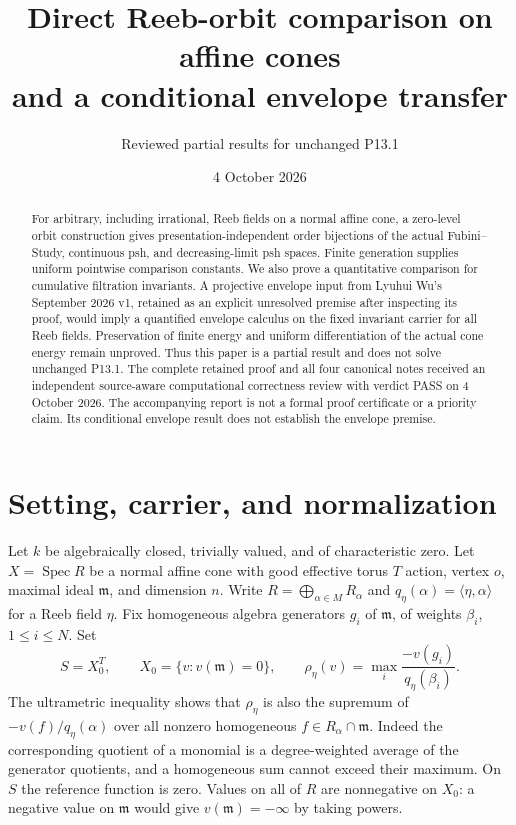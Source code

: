 \documentclass[11pt]{article}
\title{Direct Reeb-orbit comparison on affine cones\\and a conditional envelope transfer}
\author{Reviewed partial results for unchanged P13.1}
\date{4 October 2026}
\begin{document}
\maketitle
\begin{abstract}
For arbitrary, including irrational, Reeb fields on a normal affine cone, a zero-level orbit construction gives presentation-independent order bijections of the actual Fubini--Study, continuous psh, and decreasing-limit psh spaces. Finite generation supplies uniform pointwise comparison constants. We also prove a quantitative comparison for cumulative filtration invariants. A projective envelope input from Lyuhui Wu's September 2026 v1, retained as an explicit unresolved premise after inspecting its proof, would imply a quantified envelope calculus on the fixed invariant carrier for all Reeb fields. Preservation of finite energy and uniform differentiation of the actual cone energy remain unproved. Thus this paper is a partial result and does not solve unchanged P13.1. The complete retained proof and all four canonical notes received an independent source-aware computational correctness review with verdict PASS on 4 October 2026. The accompanying report is not a formal proof certificate or a priority claim. Its conditional envelope result does not establish the envelope premise.
\end{abstract}

\section{Setting, carrier, and normalization}
Let $k$ be algebraically closed, trivially valued, and of characteristic zero.
Let $X=\operatorname{Spec}R$ be a normal affine cone with good effective torus $T$ action, vertex $o$, maximal ideal $\mathfrak m$, and dimension $n$.
Write $R=\bigoplus_{\alpha\in M}R_\alpha$ and $q_\eta(\alpha)=\langle\eta,\alpha\rangle$ for a Reeb field $\eta$.
Fix homogeneous algebra generators $g_i$ of $\mathfrak m$, of weights $\beta_i$, $1\leq i\leq N$.
Set
\[
 S=X_0^T,\qquad X_0=\{v:v(\mathfrak m)=0\},\qquad
 \rho_\eta(v)=\max_i\frac{-v(g_i)}{q_\eta(\beta_i)}.
\]
The ultrametric inequality shows that $\rho_\eta$ is also the supremum of $-v(f)/q_\eta(\alpha)$ over all nonzero homogeneous $f\in R_\alpha\cap\mathfrak m$.
Indeed the corresponding quotient of a monomial is a degree-weighted average of the generator quotients, and a homogeneous sum cannot exceed their maximum.
On $S$ the reference function is zero. Values on all of $R$ are nonnegative on $X_0$: a negative value on $\mathfrak m$ would give $v(\mathfrak m)=-\infty$ by taking powers.
\end{document}
